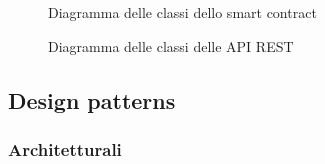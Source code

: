 \begin{figure}[H]
    
    \caption{Diagramma delle classi dello smart contract}\label{fig:contract}
\end{figure}

\begin{figure}[H]
    
    \caption{Diagramma delle classi delle API REST}\label{fig:apirest}
\end{figure}

\subsection{Design patterns}

\subsubsection{Architetturali}






